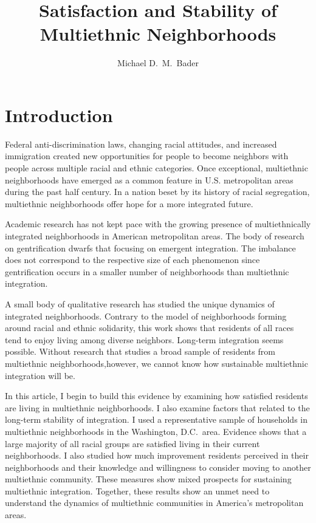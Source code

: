 \documentclass{baderart}
\title{Satisfaction and Stability of Multiethnic Neighborhoods}
\author{Michael D.\ M.\ Bader}
\begin{document}
\maketitle

\doublespace

\section{Introduction}\label{introduction}
Federal anti-discrimination laws, changing racial attitudes, and increased immigration created new opportunities for people to become neighbors with people across multiple racial and ethnic categories. Once exceptional, multiethnic neighborhoods have emerged as a common feature in U.S. metropolitan areas during the past half century. In a nation beset by its history of racial segregation, multiethnic neighborhoods offer hope for a more integrated future.

Academic research has not kept pace with the growing presence of multiethnically integrated neighborhoods in American metropolitan areas. The body of research on gentrification dwarfs that focusing on emergent integration. The imbalance does not correspond to the respective size of each phenomenon since gentrification occurs in a smaller number of neighborhoods than multiethnic integration. 

A small body of qualitative research has studied the unique dynamics of integrated neighborhoods. Contrary to the model of neighborhoods forming around racial and ethnic solidarity, this work shows that residents of all races tend to enjoy living among diverse neighbors. Long-term integration seems possible. Without research that studies a broad sample of residents from multiethnic neighborhoods,however, we cannot know how sustainable multiethnic integration will be. 

In this article, I begin to build this evidence by examining how satisfied residents are living in multiethnic neighborhoods. I also examine factors that related to the long-term stability of integration. I used a representative sample of households in multiethnic neighborhoods in the Washington, D.C.\ area. Evidence shows that a large majority of all racial groups are satisfied living in their current neighborhoods. I also studied how much improvement residents perceived in their neighborhoods and their knowledge and willingness to consider moving to another multiethnic community. These measures show mixed prospects for sustaining multiethnic integration. Together, these results show an unmet need to understand the dynamics of multiethnic communities in America's metropolitan areas. 
\end{document}
